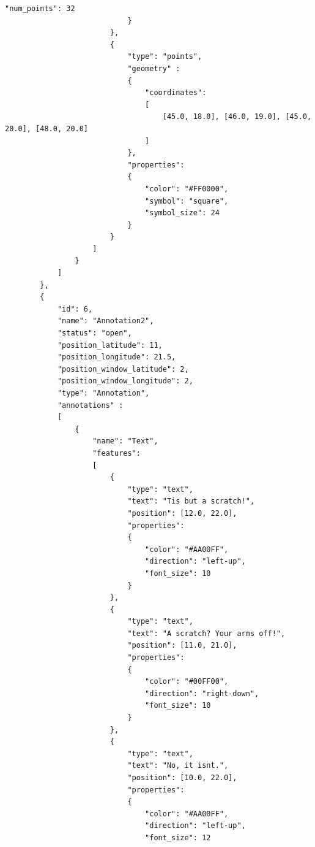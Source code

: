 \begin{lstlisting}[basicstyle=\small\ttfamily]
                                "num_points": 32
                            }
                        },
                        {
                            "type": "points",
                            "geometry" :
                            {
                                "coordinates": 
                                [
                                    [45.0, 18.0], [46.0, 19.0], [45.0, 20.0], [48.0, 20.0]
                                ]
                            },
                            "properties":
                            {
                                "color": "#FF0000",
                                "symbol": "square",
                                "symbol_size": 24
                            }
                        }
                    ]
                }
            ]
        },
        {
            "id": 6,
            "name": "Annotation2",
            "status": "open",
            "position_latitude": 11,
            "position_longitude": 21.5,
            "position_window_latitude": 2,
            "position_window_longitude": 2,
            "type": "Annotation",
            "annotations" :
            [
                {
                    "name": "Text",
                    "features":
                    [
                        {
                            "type": "text",
                            "text": "Tis but a scratch!",
                            "position": [12.0, 22.0],
                            "properties":
                            {
                                "color": "#AA00FF",
                                "direction": "left-up",
                                "font_size": 10
                            }
                        },
                        {
                            "type": "text",
                            "text": "A scratch? Your arms off!",
                            "position": [11.0, 21.0],
                            "properties":
                            {
                                "color": "#00FF00",
                                "direction": "right-down",
                                "font_size": 10
                            }
                        },
                        {
                            "type": "text",
                            "text": "No, it isnt.",
                            "position": [10.0, 22.0],
                            "properties":
                            {
                                "color": "#AA00FF",
                                "direction": "left-up",
                                "font_size": 12

\end{lstlisting}
